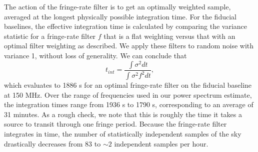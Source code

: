 \documentclass[twocolumn,numberedappendix]{emulateapj} \shorttitle{PSA64}
\begin{document}
The action of the fringe-rate filter is to get an optimally weighted
sample, averaged at the longest physically possible integration time.  For the
fiducial baselines, the effective
integration time is calculated by comparing the variance statistic for a
fringe-rate filter $f$ that is a flat weighting versus that with an optimal filter
weighting as described. We apply these filters to random noise with variance 1,
without loss of generality. We can conclude that 
\begin{equation}
    t_{int} = \frac{\int{\sigma^{2}dt}}{\int{\sigma^{2}f^{2}dt}},
\end{equation}
which evaluates to 1886 s for an optimal fringe-rate filter on the fiducial 
baseline at 150 MHz.  Over the range of frequencies used in our power spectrum
estimate, the integration times range from 1936 s to 1790 s, corresponding to an
average of 31 minutes. As a rough check, we note that this is roughly the time
it takes a source to transit through one fringe period.
Because
the fringe-rate filter integrates in time, the number of statistically
independent samples of the sky drastically decreases from 83 to $\sim2$
independent samples per hour.

%

\end{document}
